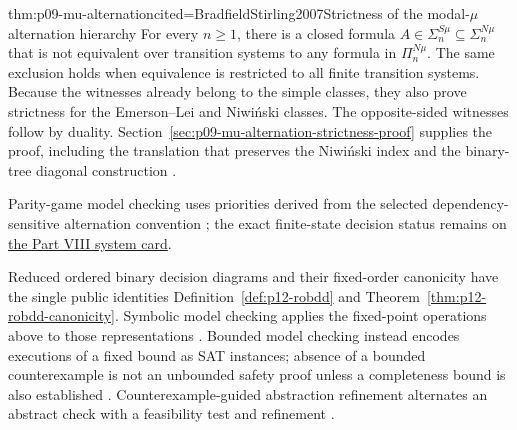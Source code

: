 \begin{hbtheorem}{thm:p09-mu-alternation}{cited=BradfieldStirling2007}{Strictness of the modal-\(\mu\) alternation hierarchy}
For every \(n\geq1\), there is a closed formula
\(A\in\Sigma^{S\mu}_n\subseteq\Sigma^{N\mu}_n\) that is not equivalent over
transition systems to any formula in \(\Pi^{N\mu}_n\).
The same exclusion holds when equivalence is restricted to all finite
transition systems. Because the witnesses already belong to the simple
classes, they also prove strictness for the Emerson--Lei and Niwi\'nski
classes. The opposite-sided witnesses follow by duality.
Section~\ref{sec:p09-mu-alternation-strictness-proof} supplies the proof,
including the translation that preserves the Niwi\'nski index and the
binary-tree diagonal construction \cite{Arnold1999BinaryHierarchy}.
\end{hbtheorem}

Parity-game model checking uses priorities derived from the selected
dependency-sensitive alternation convention \cite{EmersonJutla1999}; the
exact finite-state decision status remains on
\hyperref[entry:p08-modal-mu]{the Part VIII system card}.

Reduced ordered binary decision diagrams and their fixed-order canonicity have
the single public identities Definition~\ref{def:p12-robdd} and
Theorem~\ref{thm:p12-robdd-canonicity}.  Symbolic model checking applies the
fixed-point operations above to those representations
\cite{BurchEtAl1992}.  Bounded model checking instead encodes
executions of a fixed bound as SAT instances; absence of a bounded
counterexample is not an unbounded safety proof unless a completeness bound is
also established \cite{BiereCimattiClarkeZhu1999}.  Counterexample-guided
abstraction refinement alternates an abstract check with a feasibility test
and refinement \cite{ClarkeEtAl2003}.

